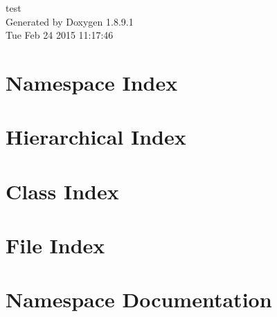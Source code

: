 \documentclass[twoside]{book}
\newcommand{\+}{\discretionary{\mbox{\scriptsize$\hookleftarrow$}}{}{}}
\newcommand{\clearemptydoublepage}{%
  \newpage{\pagestyle{empty}\cleardoublepage}%
}
\begin{document}
\hypersetup{pageanchor=false,
             bookmarks=true,
             bookmarksnumbered=true,
             pdfencoding=unicode
            }
\begin{titlepage}
\vspace*{7cm}
\begin{center}%
{\Large test }\\
\vspace*{1cm}
{\large Generated by Doxygen 1.8.9.1}\\
\vspace*{0.5cm}
{\small Tue Feb 24 2015 11:17:46}\\
\end{center}
\end{titlepage}
\clearemptydoublepage
\tableofcontents
\clearemptydoublepage
{}
\hypersetup{pageanchor=true}

\chapter{Namespace Index}

\chapter{Hierarchical Index}

\chapter{Class Index}

\chapter{File Index}

\chapter{Namespace Documentation}






\end{document}
